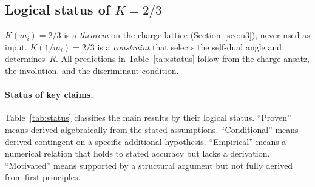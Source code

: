 \documentclass[12pt,a4paper]{article}
\begin{document}
\subsection{Logical status of $K = 2/3$}

$K(m_i) = 2/3$ is a \emph{theorem} on the charge lattice
(Section~\ref{sec:u3}), never used as input.
$K(1/m_i) = 2/3$ is a \emph{constraint} that selects the self-dual
angle and determines~$R$.  All predictions in
Table~\ref{tab:status} follow from the charge ansatz, the
involution, and the discriminant condition.

\paragraph{Status of key claims.}
Table~\ref{tab:status} classifies the main results by their
logical status. ``Proven'' means derived algebraically from the
stated assumptions. ``Conditional'' means derived contingent on
a specific additional hypothesis. ``Empirical'' means a numerical
relation that holds to stated accuracy but lacks a derivation.
``Motivated'' means supported by a structural argument but not
fully derived from first principles.
\end{document}
